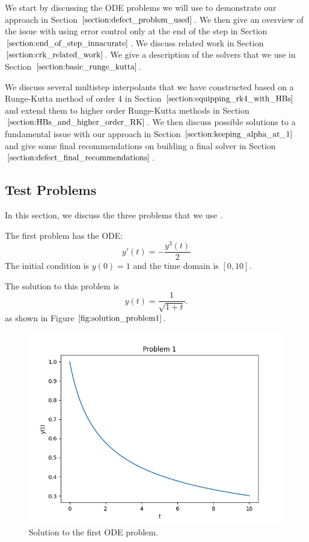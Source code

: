 We start by discussing the ODE problems we will use to demonstrate our approach in Section $\ref{section:defect_problem_used}$. We then give an overview of the issue with using error control only at the end of the step in Section $\ref{section:end_of_step_innacurate}$. We discuss related work in Section $\ref{section:crk_related_work}$. We give a description of the solvers that we use in Section $\ref{section:basic_runge_kutta}$. 

We discuss several multistep interpolants that we have constructed based on a Runge-Kutta method of order 4 in Section $\ref{section:equipping_rk4_with_HBs}$ and extend them to higher order Runge-Kutta methods in Section $\ref{section:HBs_and_higher_order_RK}$. We then discuss possible solutions to a fundamental issue with our approach in Section $\ref{section:keeping_alpha_at_1}$ and give some final recommendations on building a final solver in Section $\ref{section:defect_final_recommendations}$.

\subsection{Test Problems}
\label{section:defect_problem_used}
In this section, we discuss the three problems that we use \cite{MR1421071}. 

The first problem has the ODE:
\begin{equation}
y'(t) = - \frac{y^{3}(t)}{2} 
\end{equation}
The initial condition is $y(0) = 1$ and the time domain is $[0, 10]$.

The solution to this problem is
\begin{equation}
y(t) = \frac{1}{\sqrt{1 + t}}.
\end{equation}
as shown in Figure $\ref{fig:solution_problem1}$.

\begin{figure}[H]
\centering
\includegraphics[width=0.7\linewidth]{./figures/solution_problem1}
\caption{Solution to the first ODE problem.}
\label{fig:solution_problem1}
\end{figure}

